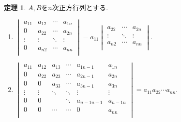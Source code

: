 \documentclass[dvipdfmx,a4paper,11pt]{article}
\theoremstyle{definition}
\newtheorem{thm}{定理}
\begin{document}
\begin{tcolorbox}[
    colback = white,
    colframe = green!35!black,
    fonttitle = \bfseries,
    breakable = true]
    \begin{thm}
    \label{determinant0}
$A,B$を$n$次正方行列とする.
\begin{enumerate}


\item 
$
\begin{vmatrix}
a_{11}& a_{12} & \cdots &a_{1n} \\
0 	   & a_{22} & \cdots &a_{2n} \\
\vdots& \vdots	&	\ddots   &	\vdots \\
0	& a_{n2} & \cdots &a_{nn} \\
\end{vmatrix}
=a_{11}
\begin{vmatrix}
 a_{22} & \cdots &a_{2n} \\
 \vdots	&	\ddots   &	\vdots \\
 a_{n2} & \cdots &a_{nn} \\
\end{vmatrix}
$.
\item 
$
\begin{vmatrix}
a_{11}& a_{12} & a_{13} &\cdots &a_{1n-1}&a_{1n} \\
0 	   & a_{22} & a_{23} &\cdots&a_{2n-1} &a_{2n} \\
0 	   & 0  		& a_{33} &\cdots &a_{3n-1}&a_{3n} \\
\vdots& \vdots	&  \ddots &\ddots&	\vdots  &	\vdots \\
0	& 0      		&      	&\ddots	&a_{n-1n-1} &a_{n-1n} \\
0	& 0      		&     \cdots	&	\cdots&0		&a_{nn} \\
\end{vmatrix}
=a_{11}a_{22}\cdots a_{nn}
$.


\end{enumerate}
\end{thm}
\end{tcolorbox}
\end{document}
